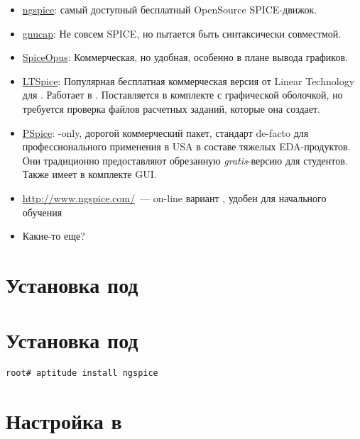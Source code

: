 \begin{itemize}
\item \href{http://ngspice.sourceforge.net/}{ngspice}: самый доступный
бесплатный OpenSource SPICE-движок.
\item
\href{https://www.gnu.org/software/gnucap/}{gnucap}:
Не совсем SPICE, но пытается быть синтаксически совместмой.
\item \href{http://www.spiceopus.si/}{SpiceOpus}: Коммерческая, но
удобная, особенно в плане вывода графиков.
\item \href{http://www.linear.com/designtools/software/}{LTSpice}:
Популярная бесплатная коммерческая версия от Linear Technology для \win.
Работает в . Поставляется в комплекте с графической оболочкой,
но требуется проверка файлов расчетных заданий, которые она создает. 
\item
\href{http://www.cadence.com/products/orcad/pspice_simulation/Pages/default.aspx}{PSpice}:
\win-only, дорогой коммерческий пакет, стандарт de-facto для
профессионального применения в USA в составе тяжелых EDA-продуктов.
Они традиционно предоставляют обрезанную \emph{gratis}-версию для студентов.
Также имеет в комплекте GUI.
\item \url{http://www.ngspice.com/}\ --- on-line вариант , удобен
для начального обучения
\item Какие-то еще?
\end{itemize}

\section{Установка  под \win}


\section{Установка  под \linux}

\begin{verbatim}
root# aptitude install ngspice
\end{verbatim}

\section{Настройка в }

